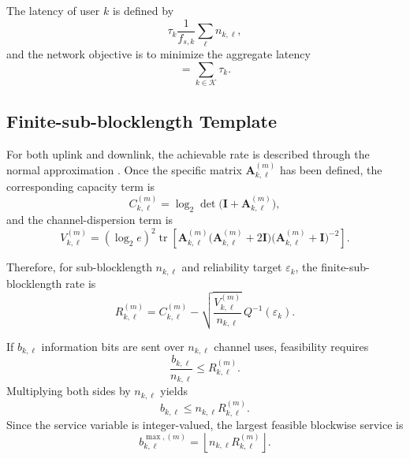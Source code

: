 \documentclass[11pt]{article}
\newcommand{\Kset}{\mathcal{K}}
\newcommand{\I}{\mathbf{I}}
\newcommand{\A}{\mathbf{A}}
\newcommand{\tr}{\operatorname{tr}}
\newcommand{\floor}[1]{\left\lfloor #1 \right\rfloor}
\begin{document}
The latency of user $k$ is defined by
\begin{equation}
\tau_k
\frac{1}{f_{s,k}}
\sum_{\ell} n_{k,\ell},
\label{eq:latency-user}
\end{equation}
and the network objective is to minimize the aggregate latency
\begin{equation}
=
\sum_{k\in\Kset}\tau_k.
\label{eq:latency-sum}
\end{equation}

\subsection{Finite-sub-blocklength Template}

For both uplink and downlink, the achievable rate is described through the normal
approximation \cite{polyanskiy2010}. Once the specific  matrix
$\A_{k,\ell}^{(m)}$ has been defined, the corresponding capacity term is
\begin{equation}
C_{k,\ell}^{(m)}
=
\log_2\det\!\bigl(\I+\A_{k,\ell}^{(m)}\bigr),
\label{eq:common-C}
\end{equation}
and the channel-dispersion term is
\begin{equation}
V_{k,\ell}^{(m)}
=
(\log_2 e)^2
\tr\!\left[
\A_{k,\ell}^{(m)}
\bigl(\A_{k,\ell}^{(m)}+2\I\bigr)
\bigl(\A_{k,\ell}^{(m)}+\I\bigr)^{-2}
\right].
\label{eq:common-V}
\end{equation}

Therefore, for sub-blocklength $n_{k,\ell}$ and reliability target
$\varepsilon_k$, the finite-sub-blocklength rate is
\begin{equation}
R_{k,\ell}^{(m)}
=
C_{k,\ell}^{(m)}
-
\sqrt{\frac{V_{k,\ell}^{(m)}}{n_{k,\ell}}}\,
Q^{-1}(\varepsilon_k).
\label{eq:common-rate}
\end{equation}

If $b_{k,\ell}$ information bits are sent over $n_{k,\ell}$ channel uses,
feasibility requires
\begin{equation}
\frac{b_{k,\ell}}{n_{k,\ell}}
\le
R_{k,\ell}^{(m)}.
\label{eq:common-feasibility-rate}
\end{equation}
Multiplying both sides by $n_{k,\ell}$ yields
\begin{equation}
b_{k,\ell}
\le
n_{k,\ell}R_{k,\ell}^{(m)}.
\label{eq:common-feasibility-bits}
\end{equation}
Since the service variable is integer-valued, the largest feasible blockwise
service is
\begin{equation}
b_{k,\ell}^{\max,(m)}
=
\floor{n_{k,\ell}R_{k,\ell}^{(m)}}.
\label{eq:common-bmax}
\end{equation}
\end{document}
